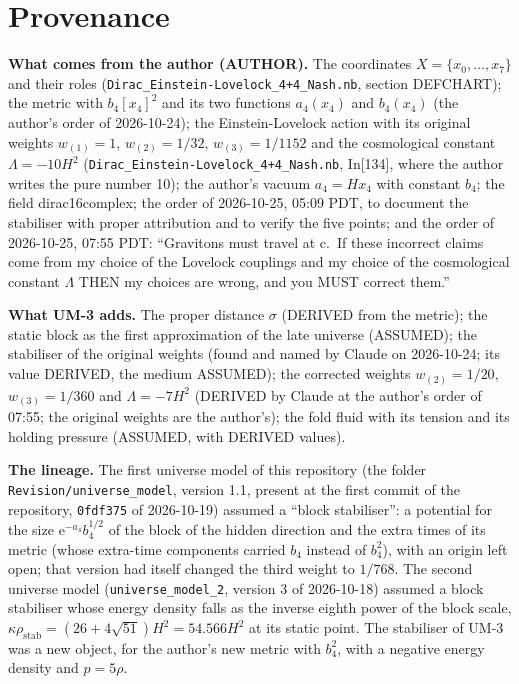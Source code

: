 \documentclass[
  10pt,
]{article}
\begin{document}
\hypertarget{provenance}{%
\section{Provenance}\label{provenance}}

\textbf{What comes from the author (AUTHOR).} The coordinates
\(X = \{x_0, \dots, x_7\}\) and their roles
(\texttt{Dirac\_Einstein-Lovelock\_4+4\_Nash.nb}, section DEFCHART); the
metric with \(b_4[x_4]^2\) and its two functions \(a_4(x_4)\) and
\(b_4(x_4)\) (the author's order of 2026-10-24); the Einstein-Lovelock
action with its original weights \(w_{(1)} = 1\), \(w_{(2)} = 1/32\),
\(w_{(3)} = 1/1152\) and the cosmological constant \(\Lambda = -10H^2\)
(\texttt{Dirac\_Einstein-Lovelock\_4+4\_Nash.nb}, In{[}134{]}, where the
author writes the pure number 10); the author's vacuum \(a_4 = Hx_4\)
with constant \(b_4\); the field dirac16complex; the order of
2026-10-25, 05:09 PDT, to document the stabiliser with proper
attribution and to verify the five points; and the order of 2026-10-25,
07:55 PDT: ``Gravitons must travel at c.~If these incorrect claims come
from my choice of the Lovelock couplings and my choice of the
cosmological constant \(\Lambda\) THEN my choices are wrong, and you
MUST correct them.''

\textbf{What UM-3 adds.} The proper distance \(\sigma\) (DERIVED from
the metric); the static block as the first approximation of the late
universe (ASSUMED); the stabiliser of the original weights (found and
named by Claude on 2026-10-24; its value DERIVED, the medium ASSUMED);
the corrected weights \(w_{(2)} = 1/20\), \(w_{(3)} = 1/360\) and
\(\Lambda = -7H^2\) (DERIVED by Claude at the author's order of 07:55;
the original weights are the author's); the fold fluid with its tension
and its holding pressure (ASSUMED, with DERIVED values).

\textbf{The lineage.} The first universe model of this repository (the
folder \texttt{Revision/universe\_model}, version 1.1, present at the
first commit of the repository, \texttt{0fdf375} of 2026-10-19) assumed
a ``block stabiliser'': a potential for the size
\(\mathrm{e}^{-a_4}b_4^{1/2}\) of the block of the hidden direction and
the extra times of its metric (whose extra-time components carried
\(b_4\) instead of \(b_4^2\)), with an origin left open; that version
had itself changed the third weight to \(1/768\). The second universe
model (\texttt{universe\_model\_2}, version 3 of 2026-10-18) assumed a
block stabiliser whose energy density falls as the inverse eighth power
of the block scale,
\(\kappa\rho_{\mathrm{stab}} = (26 + 4\sqrt{51})H^2 = 54.566H^2\) at its
static point. The stabiliser of UM-3 was a new object, for the author's
new metric with \(b_4^2\), with a negative energy density and
\(p = 5\rho\).
\end{document}
